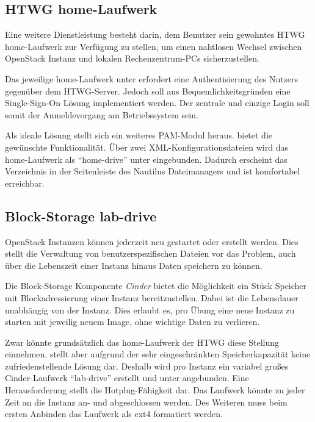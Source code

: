 \subsection{HTWG home-Laufwerk}

Eine weitere Dienstleistung besteht darin, dem Benutzer sein gewohntes HTWG home-Laufwerk zur Verfügung zu stellen, um einen nahtlosen Wechsel zwischen OpenStack Instanz und lokalen Rechenzentrum-PCs sicherzustellen.

Das jeweilige home-Laufwerk unter  erfordert eine Authentisierung des Nutzers gegenüber dem HTWG-Server. 
Jedoch soll aus Bequemlichkeitsgründen eine Single-Sign-On Lösung implementiert werden.
Der zentrale und einzige Login soll somit der Anmeldevorgang am Betriebssystem sein.

Als ideale Lösung stellt sich ein weiteres PAM-Modul heraus.  bietet die gewünschte Funktionalität. 
Über zwei XML-Konfigurationsdateien wird das home-Laufwerk als \enquote{home-drive} unter  eingebunden.
Dadurch erscheint das Verzeichnis in der Seitenleiste des Nautilus Dateimanagers und ist komfortabel erreichbar.

\subsection{Block-Storage lab-drive}

OpenStack Instanzen können jederzeit neu gestartet oder erstellt werden.
Dies stellt die Verwaltung von benutzerspezifischen Dateien vor das Problem, auch über die Lebenszeit einer Instanz hinaus Daten speichern zu können. 

Die Block-Storage Komponente \emph{Cinder} bietet die Möglichkeit ein Stück Speicher mit Blockadressierung einer Instanz bereitzustellen. 
Dabei ist die Lebensdauer unabhängig von der Instanz. 
Dies erlaubt es, pro Übung eine neue Instanz zu starten mit jeweilig neuem Image, ohne wichtige Daten zu verlieren.

Zwar könnte grundsätzlich das home-Laufwerk der HTWG diese Stellung einnehmen, stellt aber aufgrund der sehr eingeschränkten Speicherkapazität keine zufriedenstellende Lösung dar.
Deshalb wird pro Instanz ein variabel großes Cinder-Laufwerk \enquote{lab-drive} erstellt und unter  angebunden.
Eine Herausforderung stellt die Hotplug-Fähigkeit dar. 
Das Laufwerk könnte zu jeder Zeit an die Instanz an- und abgeschlossen werden.
Des Weiteren muss beim ersten Anbinden das Laufwerk als ext4 formatiert werden.


